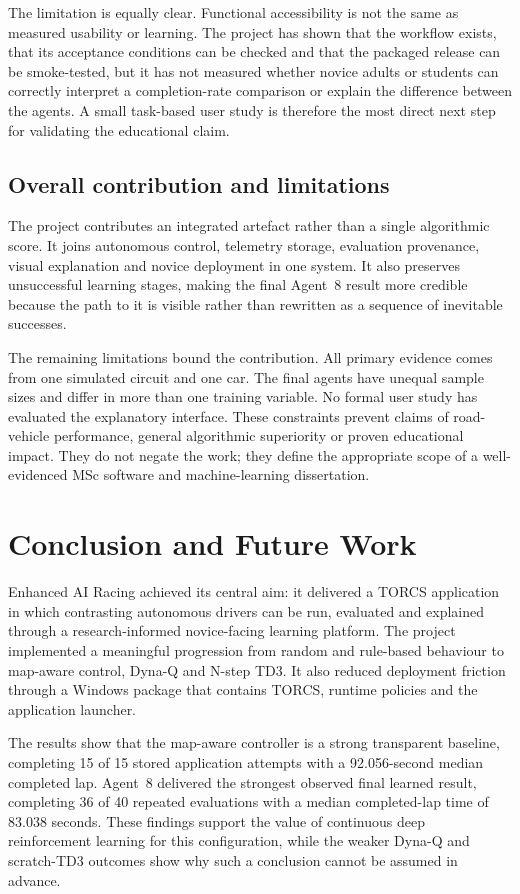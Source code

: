 The limitation is equally clear. Functional accessibility is not the same as measured usability or learning. The project has shown that the workflow exists, that its acceptance conditions can be checked and that the packaged release can be smoke-tested, but it has not measured whether novice adults or students can correctly interpret a completion-rate comparison or explain the difference between the agents. A small task-based user study is therefore the most direct next step for validating the educational claim.

\subsection{Overall contribution and limitations}

The project contributes an integrated artefact rather than a single algorithmic score. It joins autonomous control, telemetry storage, evaluation provenance, visual explanation and novice deployment in one system. It also preserves unsuccessful learning stages, making the final Agent~8 result more credible because the path to it is visible rather than rewritten as a sequence of inevitable successes.

The remaining limitations bound the contribution. All primary evidence comes from one simulated circuit and one car. The final agents have unequal sample sizes and differ in more than one training variable. No formal user study has evaluated the explanatory interface. These constraints prevent claims of road-vehicle performance, general algorithmic superiority or proven educational impact. They do not negate the work; they define the appropriate scope of a well-evidenced MSc software and machine-learning dissertation.


\section{Conclusion and Future Work}
\label{ch:conclusion}

Enhanced AI Racing achieved its central aim: it delivered a TORCS application in which contrasting autonomous drivers can be run, evaluated and explained through a research-informed novice-facing learning platform. The project implemented a meaningful progression from random and rule-based behaviour to map-aware control, Dyna-Q and N-step TD3. It also reduced deployment friction through a Windows package that contains TORCS, runtime policies and the application launcher.

The results show that the map-aware controller is a strong transparent baseline, completing 15 of 15 stored application attempts with a 92.056-second median completed lap. Agent~8 delivered the strongest observed final learned result, completing 36 of 40 repeated evaluations with a median completed-lap time of 83.038 seconds. These findings support the value of continuous deep reinforcement learning for this configuration, while the weaker Dyna-Q and scratch-TD3 outcomes show why such a conclusion cannot be assumed in advance.

